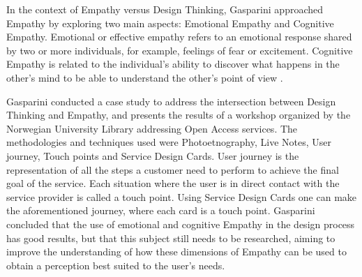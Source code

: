 \documentclass[conference]{IEEEtran}
\begin{document}

In the context of Empathy versus Design Thinking, Gasparini \cite{Gasparini} approached Empathy by exploring two main aspects: Emotional Empathy and Cognitive Empathy. Emotional or effective empathy refers to an emotional response shared by two or more individuals, for example, feelings of fear or excitement. Cognitive Empathy is related to the individual's ability to discover what happens in the other's mind to be able to understand the other's point of view \cite{Newkimbell}. 

Gasparini \cite{Gasparini} conducted a case study to address the intersection between Design Thinking and Empathy, and presents the results of a workshop organized by the Norwegian University Library addressing Open Access services. The methodologies and techniques used were Photoetnography, Live Notes, User journey, Touch points and Service Design Cards. User journey is the representation of all the steps a customer need to perform to achieve the final goal of the service. Each situation where the user is in direct contact with the service provider is called a touch point. Using Service Design Cards one can make the aforementioned journey, where each card is a touch point. Gasparini \cite{Gasparini} concluded that the use of emotional and cognitive Empathy in the design process has good results, but that this subject still needs to be researched, aiming to improve the understanding of how these dimensions of Empathy can be used to obtain a perception best suited to the user's needs.
\end{document}
